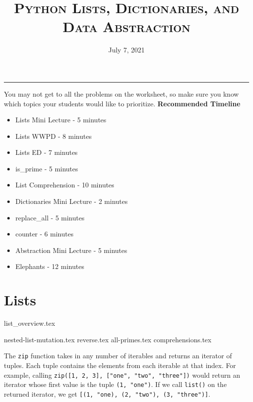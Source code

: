 \documentclass{exam}
\title{\textsc{Python Lists, Dictionaries, and Data Abstraction}}
\date{July 7, 2021}
\begin{document}
\maketitle
\rule{\textwidth}{0.15em}
\fontsize{12}{15}\selectfont


\begin{guide}
You may not get to all the problems on the worksheet, so make sure you know which topics your students would like to prioritize.
\newline
    \textbf{Recommended Timeline}
    \begin{itemize}
        \item Lists Mini Lecture - 5 minutes
        \item Lists WWPD - 8 minutes
        \item Lists ED - 7 minutes
        \item is\_prime - 5 minutes
        \item List Comprehension - 10 minutes
        \item Dictionaries Mini Lecture - 2 minutes
        \item replace\_all - 5 minutes
        \item counter - 6 minutes
        \item Abstraction Mini Lecture - 5 minutes
        \item Elephants - 12 minutes
    \end{itemize}
\end{guide}

\section{Lists}
{list_overview.tex}
\begin{questions}
{nested-list-mutation.tex}
{reverse.tex}
{all-primes.tex}
{comprehensions.tex}
\begin{guide}
\newline
The \texttt{zip} function takes in any number of iterables and returns an iterator of tuples. Each tuple contains the 
elements from each iterable at that index. For example, calling \texttt{zip([1, 2, 3], ["one", "two", "three"])} 
would return an iterator whose first value is the tuple \texttt{(1, "one")}. If we call \texttt{list()} on the 
returned iterator, we get \texttt{[(1, "one), (2, "two"), (3, "three")]}.
\end{guide}
\end{questions}
\end{document}
